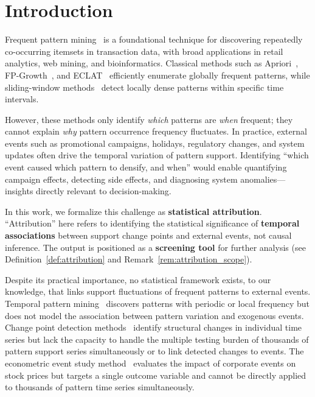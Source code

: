 \section{Introduction}\label{sec:intro}

Frequent pattern mining~\cite{agrawal1994fast,han2000mining,fournier2017survey}
is a foundational technique for discovering repeatedly co-occurring itemsets
in transaction data, with broad applications in retail analytics, web mining, and bioinformatics.
Classical methods such as Apriori~\cite{agrawal1994fast},
FP-Growth~\cite{han2000mining}, and ECLAT~\cite{zaki2000scalable}
efficiently enumerate globally frequent patterns,
while sliding-window methods~\cite{dsaa2025} detect locally dense patterns
within specific time intervals.

However, these methods only identify \emph{which} patterns are \emph{when} frequent;
they cannot explain \emph{why} pattern occurrence frequency fluctuates.
In practice, external events such as promotional campaigns, holidays,
regulatory changes, and system updates often drive the temporal variation
of pattern support.
Identifying ``which event caused which pattern to densify, and when''
would enable quantifying campaign effects, detecting side effects,
and diagnosing system anomalies---insights directly relevant to decision-making.

In this work, we formalize this challenge as \textbf{statistical attribution}.
``Attribution'' here refers to identifying the statistical significance
of \textbf{temporal associations} between support change points and external events,
not causal inference.
The output is positioned as a \textbf{screening tool} for further analysis
(see Definition~\ref{def:attribution} and Remark~\ref{rem:attribution_scope}).

Despite its practical importance, no statistical framework exists,
to our knowledge, that links support fluctuations of frequent patterns
to external events.
Temporal pattern mining~\cite{mahanta2005finding,tanbeer2009discovering,kiran2017discovering,fournier2021mining}
discovers patterns with periodic or local frequency but does not model
the association between pattern variation and exogenous events.
Change point detection methods~\cite{page1954continuous,aminikhanghahi2017survey}
identify structural changes in individual time series but lack the capacity
to handle the multiple testing burden of thousands of pattern support series simultaneously
or to link detected changes to events.
The econometric event study method~\cite{mackinlay1997event}
evaluates the impact of corporate events on stock prices but targets a single outcome variable
and cannot be directly applied to thousands of pattern time series simultaneously.


